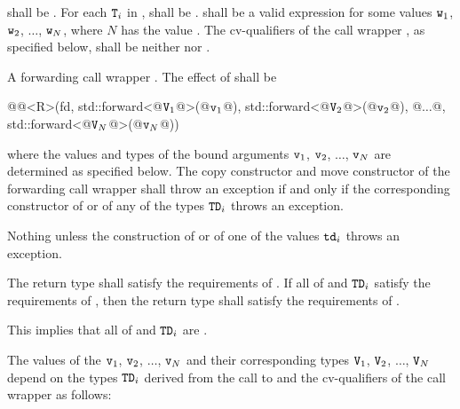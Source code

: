 \begin{itemdescr}
\pnum
\requires
{} shall be . For each $\texttt{T}_i$
in ,  shall be .
 shall be  a valid
expression for some
values $\texttt{w}_1$, $\texttt{w}_2$, $\dotsc$, $\texttt{w}_N$, where
$N$ has the value .
The cv-qualifiers \cv{} of the call wrapper ,
as specified below, shall be neither  nor .

\pnum
\returns
A forwarding call wrapper .
The effect of
 shall be
\begin{codeblock}
@@<R>(fd, std::forward<@$\texttt{V}_1$@>(@$\texttt{v}_1$@), std::forward<@$\texttt{V}_2$@>(@$\texttt{v}_2$@), @$\dotsc$@, std::forward<@$\texttt{V}_N$@>(@$\texttt{v}_N$@))
\end{codeblock}
where the values and types of the bound
arguments $\texttt{v}_1$, $\texttt{v}_2$, $\dotsc$, $\texttt{v}_N$ are determined as specified below.
The copy constructor and move constructor of the forwarding call wrapper shall throw an
exception if and only if the corresponding constructor of  or of any of the types
$\texttt{TD}_i$ throws an exception.

\pnum
\throws Nothing unless the construction of
 or of one of the values $\texttt{td}_i$ throws an exception.

\pnum
\remarks The return type shall satisfy the requirements of . If all
of  and $\texttt{TD}_i$ satisfy the requirements of , then the
return type shall satisfy the requirements of . \begin{note} This implies
that all of  and $\texttt{TD}_i$ are . \end{note}
\end{itemdescr}

\pnum
{}%
The values of the  $\texttt{v}_1$, $\texttt{v}_2$, $\dotsc$, $\texttt{v}_N$ and their
corresponding types $\texttt{V}_1$, $\texttt{V}_2$, $\dotsc$, $\texttt{V}_N$ depend on the
types $\texttt{TD}_i$ derived from
the call to  and the
cv-qualifiers \cv{} of the call wrapper  as follows:

